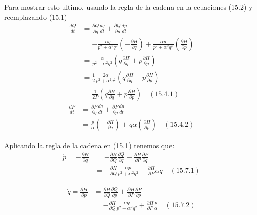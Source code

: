 \documentclass[a4paper]{article}
\begin{document}
\begin{answer}[Problema 1]
        Para mostrar esto ultimo, usando la regla de la cadena en la ecuaciones (15.2) y reemplazando (15.1)
        \begin{align*}
            \frac{dQ}{dt} &= \frac{\partial Q}{\partial q} \frac{dq}{dt} + \frac{\partial Q}{\partial p} \frac{dp}{dt}\\
            & = -\frac{\alpha q}{p^2 + \alpha^2 q^2} \left( -\frac{\partial H}{\partial q} \right) + \frac{\alpha p}{p^2 + \alpha^2 q^2} \left( \frac{\partial H}{\partial p} \right)\\
            &= \frac{\alpha}{p^2 + \alpha^2 q^2} \left( q\frac{\partial H}{\partial q} + p \frac{\partial H}{\partial p} \right)\\
            &= \frac 12\frac{2\alpha }{p^2 + \alpha^2 q^2} \left( q\frac{\partial H}{\partial q} +  p \frac{\partial H}{\partial p} \right)\\
            &= \frac 1 {2P}  \left( q\frac{\partial H}{\partial q} +  p \frac{\partial H}{\partial p} \right) \quad (15.4.1)
        \end{align*}
        \begin{align*}
            \frac{dP}{dt} &= \frac{\partial P}{\partial q} \frac{dq}{dt} + \frac{\partial P}{\partial p} \frac{dp}{dt}\\
            &=  \frac{p}{\alpha} \left( -\frac{\partial H}{\partial q} \right) + q\alpha\left( \frac{\partial H}{\partial p} \right) \quad (15.4.2)
        \end{align*}

        Aplicando la regla de la cadena en (15.1) tenemos que:
        \begin{align*}
            \dot p = -\frac{\partial H}{\partial q} &= -\frac{\partial H}{\partial Q} \frac{\partial Q}{\partial q} - \frac{\partial H}{\partial P} \frac{\partial P}{\partial q}\\
            &= -\frac{\partial H}{\partial Q} \frac{\alpha p}{p^2 + \alpha^2 q^2}  - \frac{\partial H}{\partial P} \alpha q \quad (15.7.1)
        \end{align*}

        \begin{align*}
            \dot q = \frac{\partial H}{\partial p} &= \frac{\partial H}{\partial Q} \frac{\partial Q}{\partial p} + \frac{\partial H}{\partial P} \frac{\partial P}{\partial p}\\
            &= -\frac{\partial H}{\partial Q} \frac{\alpha q}{p^2 + \alpha^2 q^2}  + \frac{\partial H}{\partial P} \frac p\alpha \quad (15.7.2)
        \end{align*}


\end{answer}
\end{document}
